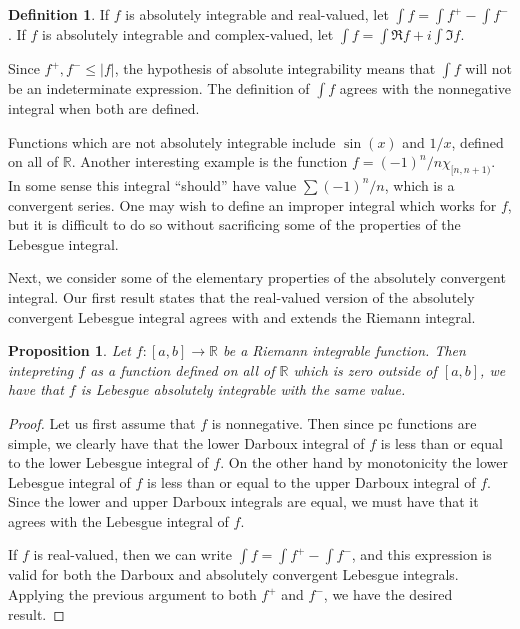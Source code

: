 \documentclass[11pt,oneside]{amsbook}
\newcommand{\RR}{{\mathbb R}}
\theoremstyle{definition}
\theoremstyle{plain}
\newtheorem{prop}[thm]{Proposition}
\theoremstyle{definition}
\newtheorem{defn}[thm]{Definition}
\theoremstyle{remark}
\numberwithin{equation}{section}
\numberwithin{figure}{section}
\begin{document}
\begin{defn}
  If $f$ is absolutely integrable and real-valued, let $\int f=\int f^+-\int f^-$. If $f$ is absolutely integrable and complex-valued, let $\int f=\int\Re f+i\int\Im f$.
\end{defn}

Since $f^+,f^-\leq|f|$, the hypothesis of absolute integrability means that $\int f$ will not be an indeterminate expression. The definition of $\int f$ agrees with the nonnegative integral when both are defined.

Functions which are not absolutely integrable include $\sin(x)$ and $1/x$, defined on all of $\RR$. Another interesting example is the function $f=(-1)^n/n\chi_{[n,n+1)}$. In some sense this integral ``should'' have value $\sum(-1)^n/n$, which is a convergent series. One may wish to define an improper integral which works for $f$, but it is difficult to do so without sacrificing some of the properties of the Lebesgue integral.

Next, we consider some of the elementary properties of the absolutely convergent integral. Our first result states that the real-valued version of the absolutely convergent Lebesgue integral agrees with and extends the Riemann integral.



\begin{prop}
  Let $f\colon[a,b]\to\RR$ be a Riemann integrable function. Then intepreting $f$ as a function defined on all of $\RR$ which is zero outside of $[a,b]$, we have that $f$ is Lebesgue absolutely integrable with the same value.
\end{prop}

\begin{proof}
  Let us first assume that $f$ is nonnegative. Then since pc functions are simple, we clearly have that the lower Darboux integral of $f$ is less than or equal to the lower Lebesgue integral of $f$. On the other hand by monotonicity the lower Lebesgue integral of $f$ is less than or equal to the upper Darboux integral of $f$. Since the lower and upper Darboux integrals are equal, we must have that it agrees with the Lebesgue integral of $f$.

  If $f$ is real-valued, then we can write $\int f=\int f^+-\int f^-$, and this expression is valid for both the Darboux and absolutely convergent Lebesgue integrals. Applying the previous argument to both $f^+$ and $f^-$, we have the desired result.
\end{proof}
\end{document}
